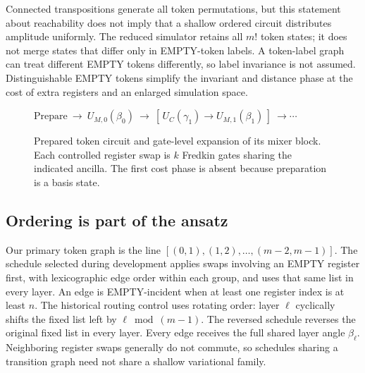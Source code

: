 \documentclass[manuscript,screen,review]{acmart}
\begin{document}
Connected transpositions generate all token permutations, but this statement
about reachability does not imply that a shallow ordered circuit distributes
amplitude uniformly. The reduced simulator retains all $m!$ token states;
it does not merge states that differ only in EMPTY-token labels. A token-label graph
can treat different EMPTY tokens differently, so label invariance is not
assumed. Distinguishable EMPTY tokens simplify the invariant and distance phase at
the cost of extra registers and an enlarged simulation space.

\begin{figure}[t]\centering
$\mathrm{Prepare}\ \longrightarrow\ U_{M,0}(\beta_0)
\ \longrightarrow\ [\,U_C(\gamma_1)\longrightarrow U_{M,1}(\beta_1)\,]
\ \longrightarrow\cdots$\\[5pt]
\caption{Prepared token circuit and gate-level expansion of its mixer block.
Each controlled register swap is $k$ Fredkin gates sharing the indicated
ancilla. The first cost phase is absent because preparation is a basis state.}
\label{fig:layer}
\end{figure}

\subsection{Ordering is part of the ansatz}
Our primary token graph is the line
$[(0,1),(1,2),\ldots,(m-2,m-1)]$. The schedule selected during development applies swaps involving an EMPTY
register first, with
lexicographic edge order within each group, and uses that same list in every
layer. An edge is EMPTY-incident when at least one register index is at least
$n$. The historical routing control uses rotating order: layer $\ell$
cyclically shifts the fixed list left by $\ell\bmod(m-1)$.
The reversed schedule reverses the original fixed list in every layer.
Every edge receives the full shared layer angle $\beta_\ell$.
Neighboring register swaps generally do not commute, so schedules sharing a
transition graph need not share a shallow variational family.
\end{document}

